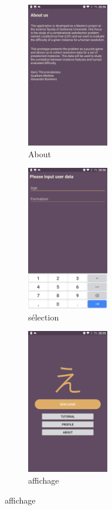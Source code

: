 \documentclass[a4paper, 11pt]{article}
\begin{document}
\begin{figure}[h!]
    \centering
    \begin{subfigure}{0.23\textwidth}
        \centering
        \includegraphics[height=2.5in]{abou}
        \caption{About}
    \end{subfigure}
    \begin{subfigure}{0.23\textwidth}
        \centering
        \includegraphics[height=2.5in]{infor}
        \caption{sélection}
    \end{subfigure}%
    \begin{subfigure}{0.23\textwidth}
        \centering
        \includegraphics[height=2.5in]{main}
        \caption{affichage}
    \end{subfigure}%

\end{figure}
\end{document}
